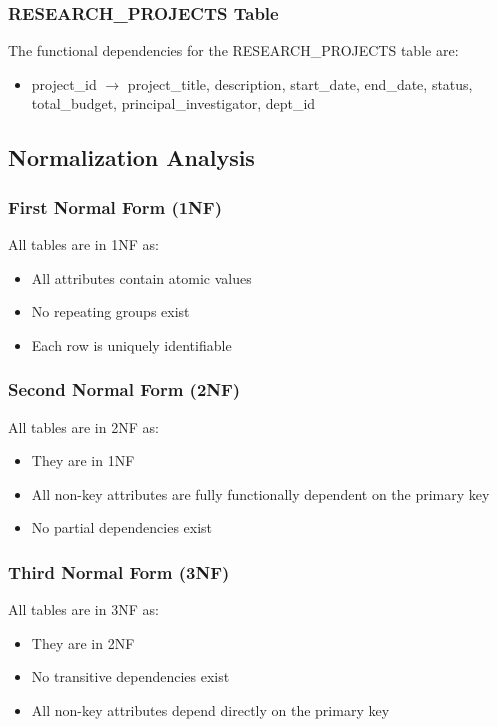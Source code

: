 \documentclass[12pt,a4paper]{article}
\begin{document}
\subsubsection{RESEARCH\_PROJECTS Table}
The functional dependencies for the RESEARCH\_PROJECTS table are:
\begin{itemize}
    \item project\_id $\rightarrow$ project\_title, description, start\_date, end\_date, status, total\_budget, principal\_investigator, dept\_id
\end{itemize}

\subsection{Normalization Analysis}

\subsubsection{First Normal Form (1NF)}
All tables are in 1NF as:
\begin{itemize}
    \item All attributes contain atomic values
    \item No repeating groups exist
    \item Each row is uniquely identifiable
\end{itemize}

\subsubsection{Second Normal Form (2NF)}
All tables are in 2NF as:
\begin{itemize}
    \item They are in 1NF
    \item All non-key attributes are fully functionally dependent on the primary key
    \item No partial dependencies exist
\end{itemize}

\subsubsection{Third Normal Form (3NF)}
All tables are in 3NF as:
\begin{itemize}
    \item They are in 2NF
    \item No transitive dependencies exist
    \item All non-key attributes depend directly on the primary key
\end{itemize}
\end{document}
